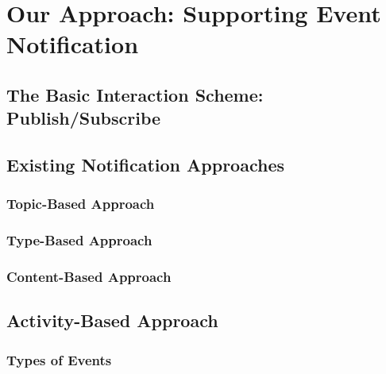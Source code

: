 \graphicspath{{Figures/}}

\chapter{Our Approach: Supporting Event Notification} %
\label{cha:event_notification}

\section{The Basic Interaction Scheme: Publish/Subscribe} %
\label{sec:the_basic_interaction_scheme_publish_subscribe}


\section{Existing Notification Approaches} %
\label{sec:existing_notification_approaches}
\subsection{Topic-Based Approach} %
\label{sub:topic_based_approach}


\subsection{Type-Based Approach} %
\label{sub:type_based_approach}


\subsection{Content-Based Approach} %
\label{sub:content_based_approach}



\section{Activity-Based Approach} %
\label{sec:activity_based_approach}
\subsection{Types of Events} %
\label{sub:types_of_events}
